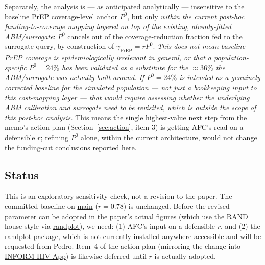 \documentclass[12pt]{article}
\newcommand{\note}[1]{{\color{noteblue}\textit{#1}}}
\begin{document}
Separately, the analysis is --- as anticipated analytically --- insensitive
to the baseline PrEP coverage-level anchor $P^0$, but only \emph{within the
current post-hoc funding-to-coverage mapping layered on top of the existing,
already-fitted ABM/surrogate}: $P^0$ cancels out of the coverage-reduction
fraction fed to the surrogate query, by construction of
$\gamma_{\text{PrEP}}=r P^0$. \note{This does not mean baseline PrEP
coverage is epidemiologically irrelevant in general, or that a
population-specific $P^0=24\%$ has been validated as a substitute for the
$\approx36\%$ the ABM/surrogate was actually built around. If $P^0=24\%$ is
intended as a genuinely corrected baseline for the simulated population ---
not just a bookkeeping input to this cost-mapping layer --- that would
require assessing whether the underlying ABM calibration and surrogate need
to be revisited, which is outside the scope of this post-hoc analysis.}
This means the single highest-value next step from the memo's action plan
(Section~\ref{sec:action}, item 3) is getting AFC's read on a defensible
$r$; refining $P^0$ alone, within the current architecture, would not
change the funding-cut conclusions reported here.

\subsection{Status}
\label{sec:status}

This is an exploratory sensitivity check, not a revision to the paper. The
committed baseline on \url{main} ($r=0.78$) is unchanged. Before the
revised parameter can be adopted in the paper's actual figures (which use
the RAND house style via \url{randplot}), we need: (1) AFC's input on a
defensible $r$, and (2) the \url{randplot} package, which is not
currently installed anywhere accessible and will be requested from Pedro.
Item~4 of the action plan (mirroring the change into
\url{INFORM-HIV-App}) is likewise deferred until $r$ is actually
adopted.
\end{document}
